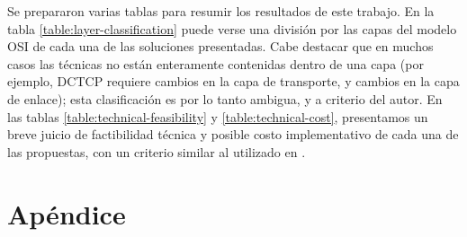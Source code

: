 \documentclass[runningheads,a4paper]{llncs}
\begin{document}
Se prepararon varias tablas para resumir los resultados de este trabajo. En la tabla \ref{table:layer-classification} puede verse una división por las capas del modelo OSI de cada una de las soluciones presentadas. Cabe destacar que en muchos casos las técnicas no están enteramente contenidas dentro de una capa (por ejemplo, DCTCP requiere cambios en la capa de transporte, y cambios en la capa de enlace); esta clasificación es por lo tanto ambigua, y a criterio del autor. En las tablas \ref{table:technical-feasibility} y \ref{table:technical-cost}, presentamos un breve juicio de factibilidad técnica y posible costo implementativo de cada una de las propuestas, con un criterio similar al utilizado en \cite{Ren_A_2014}.

\newpage

\section{Apéndice}
\end{document}
